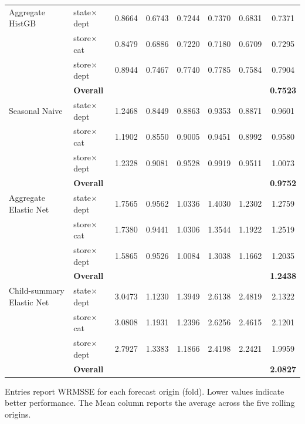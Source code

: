 \documentclass[12pt]{article}
\begin{document}
\begin{table}[H]
\begin{threeparttable}
\begin{tabular}{llccccc|c}
      \addlinespace
      Aggregate HistGB             & state$\times$dept      &   0.8664 &   0.6743 &   0.7244 &   0.7370 &   0.6831 &   0.7371 \\
                                   & store$\times$cat       &   0.8479 &   0.6886 &   0.7220 &   0.7180 &   0.6709 &   0.7295 \\
                                   & store$\times$dept      &   0.8944 &   0.7467 &   0.7740 &   0.7785 &   0.7584 &   0.7904 \\
                                   & {\bf Overall} & & & & & & {\bf 0.7523} \\
      \addlinespace
      Seasonal Naive               & state$\times$dept      &   1.2468 &   0.8449 &   0.8863 &   0.9353 &   0.8871 &   0.9601 \\
                                   & store$\times$cat       &   1.1902 &   0.8550 &   0.9005 &   0.9451 &   0.8992 &   0.9580 \\
                                   & store$\times$dept      &   1.2328 &   0.9081 &   0.9528 &   0.9919 &   0.9511 &   1.0073 \\
                                   & {\bf Overall} & & & & & & {\bf 0.9752} \\
      \addlinespace
      Aggregate Elastic Net        & state$\times$dept      &   1.7565 &   0.9562 &   1.0336 &   1.4030 &   1.2302 &   1.2759 \\
                                   & store$\times$cat       &   1.7380 &   0.9441 &   1.0306 &   1.3544 &   1.1922 &   1.2519 \\
                                   & store$\times$dept      &   1.5865 &   0.9526 &   1.0084 &   1.3038 &   1.1662 &   1.2035 \\
                                   & {\bf Overall} & & & & & & {\bf 1.2438} \\
      \addlinespace
      Child-summary Elastic Net    & state$\times$dept      &   3.0473 &   1.1230 &   1.3949 &   2.6138 &   2.4819 &   2.1322 \\
                                   & store$\times$cat       &   3.0808 &   1.1931 &   1.2396 &   2.6256 &   2.4615 &   2.1201 \\
                                   & store$\times$dept      &   2.7927 &   1.3383 &   1.1866 &   2.4198 &   2.2421 &   1.9959 \\
                                   & {\bf Overall} & & & & & & {\bf 2.0827} \\
      \bottomrule
    \end{tabular}
    \begin{tablenotes}
      \footnotesize \item Entries report WRMSSE for each forecast origin (fold). Lower values indicate better performance. The Mean column reports the average across the five rolling origins.
    \end{tablenotes}
  \end{threeparttable}
\end{table}
\end{document}
